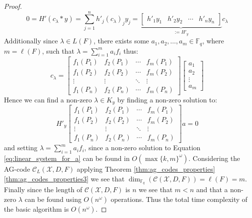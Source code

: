 \begin{proof}
  \begin{equation*}
    0 = H'(c_\lambda * y) = \sum_{j = 1}^n h'_j (c_\lambda)_{j} y_{j} = \underset{:= H'_y}{\underbrace{\begin{bmatrix}
h'_1 y_1 & h'_2 y_2 & \cdots & h'_n y_{n}
                                                          \end{bmatrix}}} c_{\lambda}
  \end{equation*}
  Additionally since $\lambda \in L(F)$, there exists some $a_1, a_2, \ldots, a_{m} \in \mathbb{F}_q$, where $m = \ell(F)$, such that $\lambda = \sum^m_{i = 1} a_i f_i$ thus:
  \begin{equation*}
    c_\lambda = \begin{bmatrix}
f_1(P_1) & f_2(P_1) & \cdots & f_m(P_{1}) \\
f_1(P_2) & f_2(P_2) & \cdots & f_m(P_{2}) \\
\vdots & \vdots & \ddots & \vdots \\
f_1(P_n) & f_{2}(P_{n}) & \cdots & f_m(P_{n})
    \end{bmatrix} \begin{bmatrix}
a_1 \\ a_2 \\ \vdots \\ a_{m}
                  \end{bmatrix}
  \end{equation*}
  Hence we can find a non-zero $\lambda \in K_y$ by finding a non-zero solution to:
  \begin{equation}\label{eq:linear_system_for_a}
    H'_{y}\begin{bmatrix}
f_1(P_1) & f_2(P_1) & \cdots & f_m(P_{1}) \\
f_1(P_2) & f_2(P_2) & \cdots & f_m(P_{2}) \\
\vdots & \vdots & \ddots & \vdots \\
f_1(P_n) & f_{2}(P_{n}) & \cdots & f_m(P_{n}) \end{bmatrix}
a = 0
  \end{equation}
  and setting $\lambda = \sum_{i=1}^m a_i f_i$, since a non-zero solution to Equation \eqref{eq:linear_system_for_a} can be found in $O(\max \{k, m\}^{\omega})$. Considering the AG-code $\mathcal{C}_{L}(\mathcal{X}, D, F)$ applying Theorem \ref{thm:ag_codes_properties}\ref{thm:ag_codes_properties3} we see that $\dim_{\mathbb{F}_q}(\mathcal{C}(\mathcal{X}, D, F)) = \ell(F) = m$. Finally since the length of $\mathcal{C}(\mathcal{X}, D, F)$ is $n$ we see that $m < n$ and that a non-zero $\lambda$ can be found using $O(n^\omega)$ operations. Thus the total time complexity of the basic algorithm is $O(n^{\omega})$.
\end{proof}
